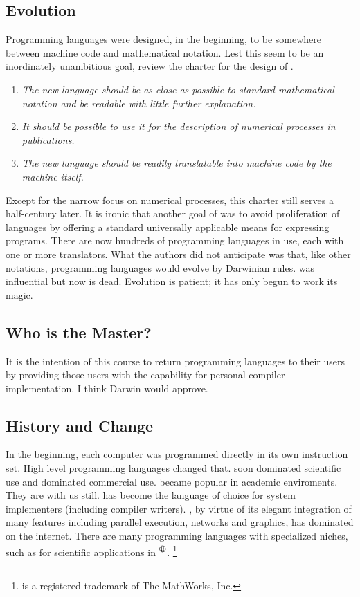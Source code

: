 \subsection{Evolution}

Programming languages were designed, in the beginning, to be somewhere between
machine code and mathematical notation.  Lest this seem to be an inordinately
unambitious goal, review the charter for the design of .

\begin{enumerate}
\item{\em The new language should be as close as possible to standard
mathematical notation and be readable with little further explanation.}
\item{\em It should be possible to use it for the description of numerical
processes in publications.}
\item{\em The new language should be readily translatable into machine
code by the machine itself.}
\end{enumerate}

Except for the narrow focus on numerical processes, this charter still
serves a half-century later.  It is ironic that another goal of
 was to avoid proliferation of languages by offering a
standard universally applicable means for expressing programs.  There
are now hundreds of programming languages in use, each with one or
more translators.  What the authors did not anticipate was that, like
other notations, programming languages would evolve by Darwinian
rules.   was influential but now is dead.  Evolution
is patient; it has only begun to work its magic.

\subsection{Who is the Master?}

It is the intention of this course to return programming languages to
their users by providing those users with the capability for personal
compiler implementation.  I think Darwin would approve.

\subsection{History and Change}

In the beginning, each computer was programmed directly in its own
instruction set.  High level programming languages changed that.
 soon dominated scientific use and 
dominated commercial use.   became popular in academic
enviroments.  They are with us still.   has become the
language of choice for system implementers (including compiler
writers).  , by virtue of its elegant integration of many
features including parallel execution, networks and graphics, has
dominated on the internet.  There are many programming languages with
specialized niches, such as  for scientific applications in
$^{\scriptstyle{\mbox{\textregistered}}}$.
\footnote{ is a registered trademark of The MathWorks,
Inc.}

